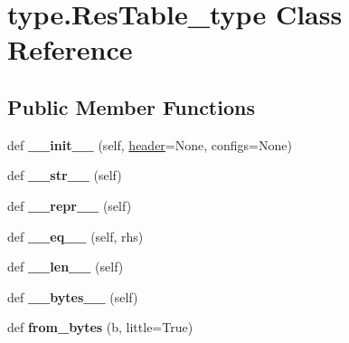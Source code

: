 \hypertarget{classtype_1_1ResTable__type}{}\section{type.\+Res\+Table\+\_\+type Class Reference}
\label{classtype_1_1ResTable__type}
\subsection*{Public Member Functions}
\begin{DoxyCompactItemize}
\item 
\mbox{\label{classtype_1_1ResTable__type_a61f04112250796efe113ccb10b463c55}} 
def {\bfseries \+\_\+\+\_\+init\+\_\+\+\_\+} (self, \mbox{\hyperlink{classtype_1_1ResTable__type_ae0ced730ac21545acd3efe0c40eb1203}{header}}=None, configs=None)
\item 
\mbox{\label{classtype_1_1ResTable__type_a59799c35d96ef70e8418c998963eac3c}} 
def {\bfseries \+\_\+\+\_\+str\+\_\+\+\_\+} (self)
\item 
\mbox{\label{classtype_1_1ResTable__type_a4042a6578d706f29e863fc8a37316d10}} 
def {\bfseries \+\_\+\+\_\+repr\+\_\+\+\_\+} (self)
\item 
\mbox{\label{classtype_1_1ResTable__type_a1c48582a826d4d452a54bf6706c47f45}} 
def {\bfseries \+\_\+\+\_\+eq\+\_\+\+\_\+} (self, rhs)
\item 
\mbox{\label{classtype_1_1ResTable__type_a2c0ed96ee7c68fefec669404167b37f8}} 
def {\bfseries \+\_\+\+\_\+len\+\_\+\+\_\+} (self)
\item 
\mbox{\label{classtype_1_1ResTable__type_af0dfcb88685ec57eaf7c1097b496b0d3}} 
def {\bfseries \+\_\+\+\_\+bytes\+\_\+\+\_\+} (self)
\item 
\mbox{\label{classtype_1_1ResTable__type_a6012dea12cf7c1ed20be9383b1018833}} 
def {\bfseries from\+\_\+bytes} (b, little=True)
\end{DoxyCompactItemize}
